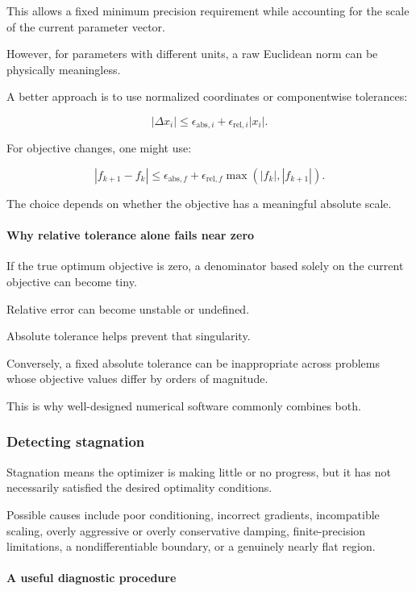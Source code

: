 This allows a fixed minimum precision requirement while accounting for the scale of the current parameter vector.

However, for parameters with different units, a raw Euclidean norm can be physically meaningless.

A better approach is to use normalized coordinates or componentwise tolerances:

\[
|\Delta x_i| \le \epsilon_{\mathrm{abs},i} + \epsilon_{\mathrm{rel},i}|x_i|.
\]

For objective changes, one might use:

\[
|f_{k+1}-f_k| \le \epsilon_{\mathrm{abs},f} + \epsilon_{\mathrm{rel},f}\max(|f_k|,|f_{k+1}|).
\]

The choice depends on whether the objective has a meaningful absolute scale.

\paragraph{Why relative tolerance alone fails near zero}\label{02-foundations-ii-ch027-why-relative-tolerance-alone-fails-near-zero}

If the true optimum objective is zero, a denominator based solely on the current objective can become tiny.

Relative error can become unstable or undefined.

Absolute tolerance helps prevent that singularity.

Conversely, a fixed absolute tolerance can be inappropriate across problems whose objective values differ by orders of magnitude.

This is why well-designed numerical software commonly combines both.

\subsubsection{Detecting stagnation}\label{02-foundations-ii-ch027-detecting-stagnation}

Stagnation means the optimizer is making little or no progress, but it has not necessarily satisfied the desired optimality conditions.

Possible causes include poor conditioning, incorrect gradients, incompatible scaling, overly aggressive or overly conservative damping, finite-precision limitations, a nondifferentiable boundary, or a genuinely nearly flat region.

\paragraph{A useful diagnostic procedure}\label{02-foundations-ii-ch027-a-useful-diagnostic-procedure}

